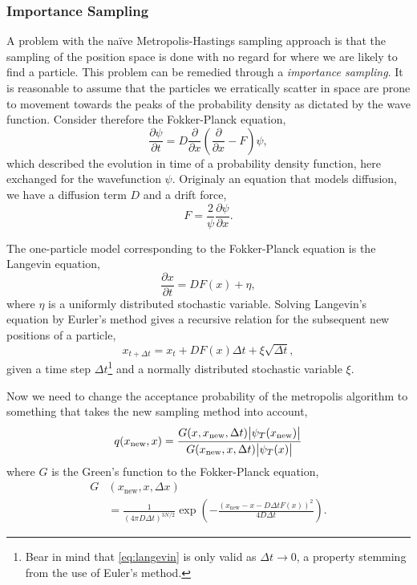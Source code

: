 \documentclass[
    a4paper, aps, twocolumn, floatfix, superscriptaddress, nofootinbib]{revtex4-1}
\newcommand{\1}{\mathds{1}}
\begin{document}
\subsubsection{Importance Sampling}
A problem with the naïve Metropolis-Hastings sampling approach is that the sampling of the position space is done with
no regard for where we are likely to find a particle. This problem can be remedied through a \emph{importance sampling}.
It is reasonable to assume that the particles we erratically scatter in space are prone to movement towards the peaks
of the probability density as dictated by the wave function. Consider therefore the Fokker-Planck equation,
\begin{equation}
    \frac{\partial \psi}{\partial t} = D \frac{\partial }{\partial x}\left(\frac{\partial }{\partial x} - F \right) \psi,
    \label{eq:fokker_planck}
\end{equation}
which described the evolution in time of a probability density function, here exchanged for the wavefunction $\psi$.
Originaly an equation that models diffusion, we have a diffusion term $D$ and a drift force,
\begin{equation}
    F = \frac{2}{\psi} \frac{\partial \psi}{\partial x}.
\end{equation}

The one-particle model corresponding to the Fokker-Planck equation is the Langevin equation,
\begin{equation}
    \frac{\partial x}{\partial t} = D F(x) + \eta,
    \label{eq:langevin}
\end{equation}
where $\eta$ is a uniformly distributed stochastic variable. Solving Langevin's equation by Eurler's method gives a recursive relation for
the subsequent new positions of a particle,
\begin{equation}
    x_{t+\Delta t} = x_t + D F(x) \Delta t +\xi \sqrt{\Delta t},
\end{equation}
given a time step $\Delta t$\footnote{Bear in mind that \autoref{eq:langevin} is only valid as $\Delta t \to 0$, a property stemming from the use of Euler's method.} and a normally distributed stochastic variable $\xi$.

Now we need to change the acceptance probability of the metropolis algorithm to something that takes
the new sampling method into account,
\begin{equation}
    q(x_{\text{new}}, x) = \frac{G(x, x_{\text{new}}, \Delta t)\abs{\psi_T(x_{\text{new}})}}{G(x_{\text{new}}, x, \Delta t)\abs{\psi_T(x)}}
\end{equation}
where $G$ is the Green's function to the Fokker-Planck equation,
\begin{align}
    G&(x_{\text{new}}, x, \Delta x) \nonumber \\
    &= \frac{1}{(4\pi D \Delta t)^{3N/2}}\exp\left(-\frac{(x_{\text{new}} - x - D\Delta t F(x))^2}{4D\Delta t} \right).
\end{align}
\end{document}
